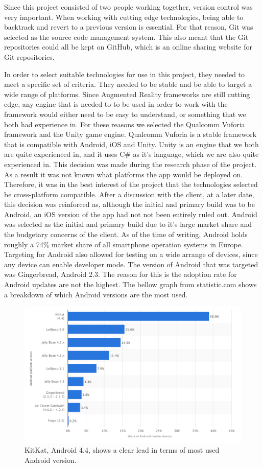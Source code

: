 Since this project consisted of two people working together, version control was very important. When working with cutting edge technologies, being able to backtrack and revert to a previous version is essential. For that reason, Git was selected as the source code management system. This also meant that the Git repositories could all be kept on GitHub, which is an online sharing website for Git repositories.

In order to select suitable technologies for use in this project, they needed to meet a specific set of criteria. They needed to be stable and be able to target a wide range of platforms. Since Augmented Reality frameworks are still cutting edge, any engine that is needed to to be used in order to work with the framework would either need to be easy to understand, or something that we both had experience in. For these reasons we selected the Qualcomm Vuforia framework and the Unity game engine. Qualcomm Vuforia is a stable framework that is compatible with Android, iOS and Unity. Unity is an engine that we both are quite experienced in, and it uses C\# as it’s language, which we are also quite experienced in. This decision was made during the research phase of the project. As a result it was not known what platforms the app would be deployed on. Therefore, it was in the best interest of the project that the technologies selected be cross-platform compatible. After a discussion with the client, at a later date, this decision was reinforced as, although the initial and primary build was to be Android, an iOS version of the app had not not been entirely ruled out. Android was selected as the initial and primary build due to it’s large market share and the budgetary concerns of the client. As of the time of writing, Android holds roughly a  74\% market share of all smartphone operation systems in Europe.\cite{kantra} Targeting for Android also allowed for testing on a wide arrange of devices, since any device can enable developer mode. The version of Android that was targeted was Gingerbread, Android 2.3. The reason for this is the adoption rate for Android updates are not the highest. The bellow graph from statistic.com\cite{statista} shows a breakdown of which Android versions are the most used. 

\begin{figure}[ht!]
	\centering
	\includegraphics[width=120mm]{graph1.png}
	\caption{KitKat, Android 4.4, shows a clear lead in terms of most used Android version. \label{overflow}}
\end{figure}


